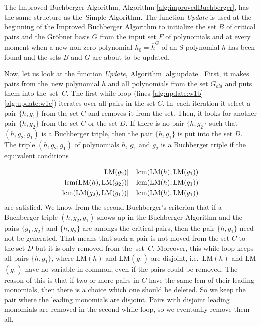 The Improved Buchberger Algorithm, Algorithm \ref{alg:improvedBuchberger}, has the same structure as the~Simple Algorithm. The function \textit{Update} is used at the beginning of the Improved Buchberger Algorithm to initialize the set $B$ of critical pairs and the Gr\"obner basis $G$ from the input set $F$ of polynomials and at every moment when a new non-zero polynomial $h_0 = \overline{h}^G$ of an S-polynomial $h$ has been found and the sets $B$ and $G$ are about to be updated.



Now, let us look at the function \textit{Update}, Algorithm \ref{alg:update}. First, it makes pairs from the~new polynomial $h$ and all polynomials from the set $G_{old}$ and puts them into the~set~$C$. The first while loop (lines \ref{alg:update:w1b} -- \ref{alg:update:w1e}) iterates over all pairs in the set $C$. In~each iteration it select a pair $\{h, g_1\}$ from the set $C$ and removes it from the set. Then, it looks for another pair $\{h, g_2\}$ from the set $C$ or the set $D$. If there is no pair $\{h, g_2\}$ such that $(h, g_2, g_1)$ is a Buchberger triple, then the pair $\{h, g_1\}$ is put into the set $D$. The triple $(h, g_2, g_1)$ of polynomials $h$, $g_1$ and $g_2$ is a Buchberger triple if the equivalent conditions 

\begin{eqnarray}
	\operatorname{LM}(g_2) &|& \operatorname{lcm}(\operatorname{LM}(h), \operatorname{LM}(g_1))\\
	\operatorname{lcm}(\operatorname{LM}(h), \operatorname{LM}(g_2) ) &|& \operatorname{lcm}(\operatorname{LM}(h), \operatorname{LM}(g_1))\\
	\operatorname{lcm}(\operatorname{LM}(g_2), \operatorname{LM}(g_1)) &|& \operatorname{lcm}(\operatorname{LM}(h), \operatorname{LM}(g_1))
\end{eqnarray}
are satisfied. We know from the second Buchberger's criterion that if a Buchberger triple $(h, g_2, g_1)$ shows up in the Buchberger Algorithm and the pairs $\{g_1, g_2\}$ and $\{h, g_2\}$ are amongs the critical pairs, then the pair $\{h, g_1\}$ need not be generated. That means that such a pair is not moved from the set $C$ to the set $D$ but it is only removed from the~set~$C$. Moreover, this while loop keeps all pairs $\{h, g_1\}$, where LM$(h)$ and LM$(g_1)$ are disjoint, i.e.\ LM$(h)$ and LM$(g_1)$ have no variable in common, even if the pairs could be removed. The reason of this is that if two or more pairs in $C$ have the same lcm of their leading monomials, then there is a choice which one should be deleted. So we keep the pair where the leading monomials are disjoint. Pairs with disjoint leading monomials are removed in the second while loop, so we eventually remove them all.

